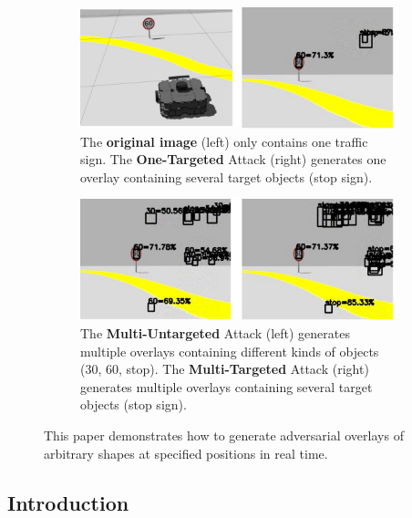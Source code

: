 \begin{figure}[H]
    \centering
    \begin{subfigure}[b]{\textwidth}
        \includegraphics[width=\linewidth]{figures/chapter_detection/detection/one.jpg}
        \caption{The \textbf{original image} (left) only contains one traffic sign. The \textbf{One-Targeted} Attack (right) generates one overlay containing several target objects (stop sign).}
        \label{fig:sparse-untar} 
    \end{subfigure}

    \begin{subfigure}[b]{\textwidth}
        \includegraphics[width=1\linewidth]{figures/chapter_detection/detection/multi.jpg}
        \caption{The \textbf{Multi-Untargeted} Attack (left) generates multiple overlays containing different kinds of objects (30, 60, stop). The \textbf{Multi-Targeted} Attack (right) generates multiple overlays containing several target objects (stop sign).}
        \label{fig:dense-untar}
    \end{subfigure}
    \caption{This paper demonstrates how to generate adversarial overlays of arbitrary shapes at specified positions in real time.}
    \label{fig:detection.overview}
\end{figure}

\subsection{Introduction}

